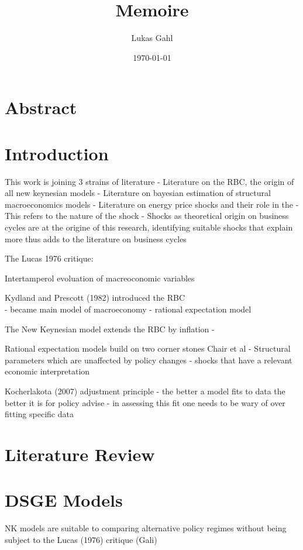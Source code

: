\documentclass[12pt,a4paper,english]{article} %
\author{Lukas Gahl}
\title{\textbf{\huge Memoire }\\}
\date{\today}
\let\oldsection\section
\renewcommand\section{\clearpage\oldsection}
\begin{document}
	
	
	\maketitle
	\pagebreak

	\section*{Abstract}
	\pagebreak

	
	\tableofcontents
	\pagebreak
	
	
	 \section{Introduction}
	 
	
	This work is joining 3 strains of literature
	- Literature on the RBC, the origin of all new keynesian models
	- Literature on bayesian estimation of structural macroeconomics models
	- Literature on energy price shocks and their role in the 
		- This refers to the nature of the shock
		- Shocks as theoretical origin on business cycles are at the origine of this research, 
		identifying suitable shocks that explain more thus adds to the literature on business cycles
	
	The Lucas 1976 critique: 
	
	Intertamperol evoluation of macreoconomic variables
	
	Kydland and Prescott (1982) introduced the RBC \\
	- became main model of macroeconomy
	- rational expectation model
	
	The New Keynesian model extends the RBC by inflation
	- 
	
	Rational expectation models build on two corner stones Chair et al
	- Structural parameters which are unaffected by policy changes
	- shocks that have a relevant economic interpretation
	
	Kocherlakota (2007) adjustment principle
	- the better a model fits to data the better it is for policy advise
	- in assessing this fit one needs to be wary of over fitting specific data
	
	\section{Literature Review}
	

	\section{DSGE Models}
	NK models are suitable to comparing alternative policy regimes without being subject to the Lucas (1976) critique (Gali)
	
\end{document}
